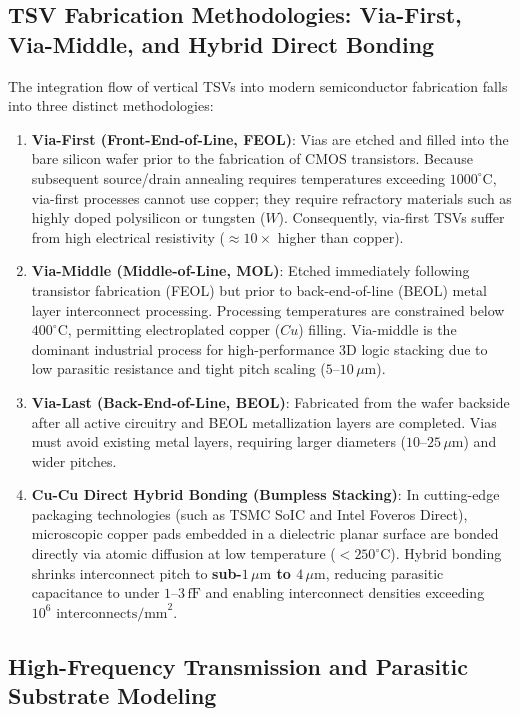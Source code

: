 \subsection{TSV Fabrication Methodologies: Via-First, Via-Middle, and Hybrid Direct Bonding}
\label{subsec:ch8_tsv_fab}
The integration flow of vertical TSVs into modern semiconductor fabrication falls into three distinct methodologies:
\begin{enumerate}
    \item \textbf{Via-First (Front-End-of-Line, FEOL)}: Vias are etched and filled into the bare silicon wafer prior to the fabrication of CMOS transistors. Because subsequent source/drain annealing requires temperatures exceeding $1000^\circ\mathrm{C}$, via-first processes cannot use copper; they require refractory materials such as highly doped polysilicon or tungsten ($W$). Consequently, via-first TSVs suffer from high electrical resistivity ($\approx 10\times$ higher than copper).
    \item \textbf{Via-Middle (Middle-of-Line, MOL)}: Etched immediately following transistor fabrication (FEOL) but prior to back-end-of-line (BEOL) metal layer interconnect processing. Processing temperatures are constrained below $400^\circ\mathrm{C}$, permitting electroplated copper ($Cu$) filling. Via-middle is the dominant industrial process for high-performance 3D logic stacking due to low parasitic resistance and tight pitch scaling ($5\text{--}10\,\mu\text{m}$).
    \item \textbf{Via-Last (Back-End-of-Line, BEOL)}: Fabricated from the wafer backside after all active circuitry and BEOL metallization layers are completed. Vias must avoid existing metal layers, requiring larger diameters ($10\text{--}25\,\mu\text{m}$) and wider pitches.
    \item \textbf{Cu-Cu Direct Hybrid Bonding (Bumpless Stacking)}: In cutting-edge packaging technologies (such as TSMC SoIC and Intel Foveros Direct), microscopic copper pads embedded in a dielectric planar surface are bonded directly via atomic diffusion at low temperature ($< 250^\circ\mathrm{C}$). Hybrid bonding shrinks interconnect pitch to \textbf{sub-$1\,\mu\text{m}$ to $4\,\mu\text{m}$}, reducing parasitic capacitance to under $1\text{--}3\,\text{fF}$ and enabling interconnect densities exceeding $10^6\text{ interconnects/mm}^2$.
\end{enumerate}

\subsection{High-Frequency Transmission and Parasitic Substrate Modeling}
\label{subsec:ch8_tsv_parasitics}

